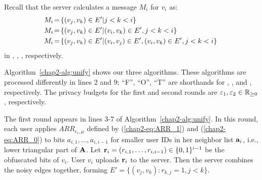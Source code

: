 Recall that the server calculates a message $M_i$ for $v_i$ as:
\begin{align}
\hspace{-1mm} M_i \hspace{-0.5mm} &= \hspace{-0.5mm} \{(v_j, v_k) \in E' | j<k<i\} \label{chap2-eq:M_i_I}\\
\hspace{-1mm} M_i \hspace{-0.5mm} &= \hspace{-0.5mm} \{(v_j, v_k) \in E' | (v_i, v_k) \in E', j<k<i\} \label{chap2-eq:M_i_II}\\
\hspace{-1mm} M_i \hspace{-0.5mm} &= \hspace{-0.5mm}  \{(v_j, v_k) \in E' | (v_i, v_j) \in E', (v_i, v_k) \in E', j<k<i\} \label{chap2-eq:M_i_III}
\end{align}
in \AlgOne{}, \AlgTwo{}, \AlgThree{}, respectively.

Algorithm~\ref{chap2-alg:unify} shows our three algorithms.
These algorithms are processed differently in lines 2 and 9; ``F'', ``O'', ``T'' are shorthands for \AlgOne{}, \AlgTwo{}, and \AlgThree{}, respectively.
The privacy budgets for the first and second
rounds are $\varepsilon_1, \varepsilon_2 \in \mathbb{R}_{\ge0}$, respectively.

The first round appears in lines 3-7 of Algorithm~\ref{chap2-alg:unify}.
In this round, each user applies
$ARR_{\epsilon_1, \mu}$
defined by (\ref{chap2-eq:ARR_1}) and (\ref{chap2-eq:ARR_0}) to bits $a_{i,1}, \ldots, a_{i,i-1}$ for smaller user IDs in her neighbor list $\mathbf{a}_i$, i.e., lower triangular part of $\mathbf{A}$.
Let $\mathbf{r}_i = (r_{i,1}, \ldots, r_{i,i-1}) \in \{0,1\}^{i-1}$ be the obfuscated bits of $v_i$.
User $v_i$ uploads $\mathbf{r}_i$ to the server.
Then the server combines the noisy edges together, forming $E' = \{(v_j, v_k) : r_{k,j} = 1, j < k\}$.

